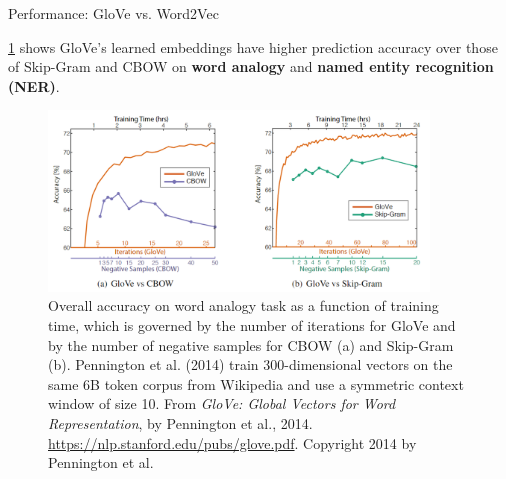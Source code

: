 \begin{frame}{Performance: GloVe vs. Word2Vec}
    \vspace{20pt}
    
    \cref{fig:gloveVsWord2vec} shows GloVe's learned embeddings have higher prediction accuracy over those of Skip-Gram and CBOW on \textbf{word analogy} and \textbf{named entity recognition (NER)}.
    
    \begin{figure}[h]
    \vspace{-15pt}
    \centering
    \includegraphics[width=0.9\textwidth]{imgs/table_gloveVSword2vec.png}
    \vspace{-5pt}
    \caption{\linespread{0.1}\tiny Overall accuracy on word analogy task as a function of training time, which is governed by the number of iterations for GloVe and by the number of  negative samples for CBOW (a) and Skip-Gram (b). Pennington et al. (2014) train 300-dimensional vectors on the same 6B token corpus from Wikipedia and use a symmetric context window of size 10. From \emph{GloVe: Global Vectors for Word Representation}, by Pennington et al., 2014. \url{https://nlp.stanford.edu/pubs/glove.pdf}. Copyright 2014 by Pennington et al.}
    \vspace{-5pt}
    \label{fig:gloveVsWord2vec}
    \end{figure}
\end{frame}